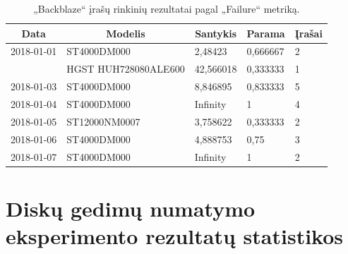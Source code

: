 \documentclass{VUMIFPSkursinis}
\begin{document}
\begin{table}[H]
\centering
\caption{„Backblaze“ įrašų rinkinių rezultatai pagal „Failure“ metriką.}
\label{tab:rezFail}
{\begin{tabular}{|l|l|l|l|l|}
\hline
\multicolumn{1}{|c|}{\textbf{Data}} & \multicolumn{1}{c|}{\textbf{Modelis}} & \multicolumn{1}{c|}{\textbf{Santykis}} & \multicolumn{1}{c|}{\textbf{Parama}} & \multicolumn{1}{c|}{\textbf{Įrašai}} \\ \hline
2018-01-01                          & ST4000DM000                           & 2,48423                                & 0,666667                             & 2                                    \\ \hline
\cellcolor[HTML]{C0C0C0}            & HGST HUH728080ALE600                  & 42,566018                              & 0,333333                             & 1                                    \\ \hline
2018-01-03                          & ST4000DM000                           & 8,846895                               & 0,833333                             & 5                                    \\ \hline
2018-01-04                          & ST4000DM000                           & Infinity                               & 1                                    & 4                                    \\ \hline
2018-01-05                          & ST12000NM0007                         & 3,758622                               & 0,333333                             & 2                                    \\ \hline
2018-01-06                          & ST4000DM000                           & 4,888753                               & 0,75                                 & 3                                    \\ \hline
2018-01-07                          & ST4000DM000                           & Infinity                               & 1                                    & 2                                    \\ \hline
\end{tabular}}
\end{table}

\section{Diskų gedimų numatymo eksperimento rezultatų statistikos} \label{sec:rezStats}
\end{document}
